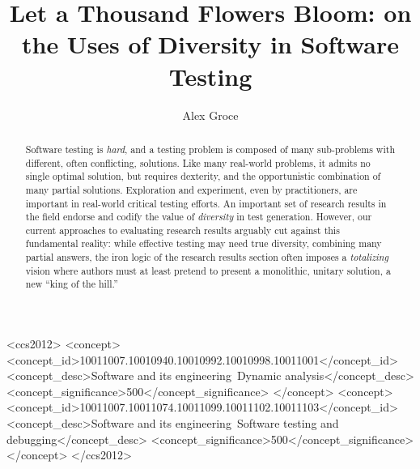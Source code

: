 \documentclass[sigplan]{acmart}
\begin{document}
\title{Let a Thousand Flowers Bloom: on the Uses of Diversity in
  Software Testing}

\author{Alex Groce}


\renewcommand{\shortauthors}{Alex Groce}

\begin{abstract}
Software testing is \emph{hard}, and a testing problem is composed of
many sub-problems with different, often conflicting, solutions.  Like many real-world problems, it
admits no single optimal solution, but requires dexterity, and the
opportunistic combination of many partial solutions.  Exploration and
experiment, even by practitioners, are important in real-world
critical testing efforts.  An important set of research results in the
field endorse and codify the value of \emph{diversity} in test generation.
However, our current approaches to evaluating research results
arguably cut against this fundamental reality: while effective testing
may need true diversity, combining many partial answers, the iron
logic of the research results section often imposes a
\emph{totalizing} vision where authors must at least pretend to
present a monolithic, unitary solution, a new ``king of the hill.''
\end{abstract}

\begin{CCSXML}
<ccs2012>
<concept>
<concept_id>10011007.10010940.10010992.10010998.10011001</concept_id>
<concept_desc>Software and its engineering~Dynamic analysis</concept_desc>
<concept_significance>500</concept_significance>
</concept>
<concept>
<concept_id>10011007.10011074.10011099.10011102.10011103</concept_id>
<concept_desc>Software and its engineering~Software testing and debugging</concept_desc>
<concept_significance>500</concept_significance>
</concept>
</ccs2012>
\end{CCSXML}
\end{document}
